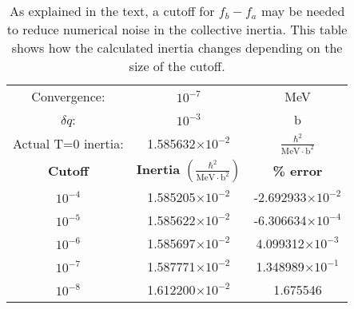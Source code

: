 \begin{table}
	\centering
\begin{tabular}{|ccc|}
	\hline Convergence: & $10^{-7}$ & MeV \\ 
	$\delta q$: & $10^{-3}$ & b \\ 
	Actual T=0 inertia: & 1.585632$\times10^{-2}$ & $\frac{\hbar^2}{\mathrm{MeV \cdot b}^2}$ \\ \hline
	\textbf{Cutoff} & \textbf{Inertia} $\left(\frac{\hbar^2}{\mathrm{MeV \cdot b}^2}\right)$ & \textbf{\% error} \\ \hline
	$10^{-4}$ & 1.585205$\times10^{-2}$ & -2.692933$\times10^{-2}$ \\
	$10^{-5}$ & 1.585622$\times10^{-2}$ & -6.306634$\times10^{-4}$ \\
	$10^{-6}$ & 1.585697$\times10^{-2}$ & 4.099312$\times10^{-3}$ \\
	$10^{-7}$ & 1.587771$\times10^{-2}$ & 1.348989$\times10^{-1}$ \\
	$10^{-8}$ & 1.612200$\times10^{-2}$ & 1.675546 \\ \hline
\end{tabular}
	\caption{As explained in the text, a cutoff for $f_b-f_a$ may be needed to reduce numerical noise in the collective inertia. This table shows how the calculated inertia changes depending on the size of the cutoff.}
	\label{tab:cutoff}
\end{table}